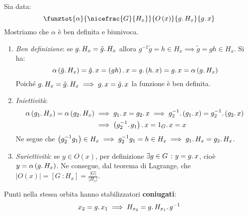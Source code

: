 \begin{demonstration}
Sia data:
\begin{equation*}
	\funztot{\alpha}{\nicefrac{G}{H_x}}{O\left(x\right)}{g\ldotp H_x}{g\ldotp x}
\end{equation*}
Mostriamo che $\alpha$ è ben definita e biunivoca.
\begin{enumerate}
	\item \textit{Ben definizione}: se $g\ldotp H_x=\tilde{g}\ldotp H_x$ allora $g^{-1}\tilde{g}=h\in H_x\implies\tilde{g}=gh\in H_x$. Si ha:
	\begin{equation*}
		\alpha\left(\tilde{g}\ldotp H_x\right)=\tilde{g}\ldotp x = \left(gh\right)\ldotp x = g \ldotp\left( h\ldotp x\right)=g\ldotp x=\alpha\left(g\ldotp H_x\right)
	\end{equation*}
 Poiché $g\ldotp H_x=\tilde{g}\ldotp H_x\implies g\ldotp x=\tilde{g}\ldotp x$ la funzione è ben definita.
 \item \textit{Iniettività}:
 \begin{align*}
 	\alpha\left(g_1\ldotp H_x\right)=\alpha\left(g_2\ldotp H_x\right)&\implies g_1\ldotp x=g_2\ldotp x\implies g_2^{-1}\ldotp\left(g_1\ldotp x\right)=g_2^{-1}\ldotp\left(g_2\ldotp x\right)\\
 	&\implies \left(g_2^{-1}\ldotp g_1\right)\ldotp x=1_G\ldotp x=x
 \end{align*}
Ne segue che $\left(g_2^{-1} g_1\right)\in H_x\implies g_2^{-1} g_1=h\in H_x\implies g_1\ldotp H_x=g_2\ldotp H_x$.
\item \textit{Suriettività}: se $y\in O\left(x\right)$, per definizione $\exists g\in G\ \colon y=g\ldotp x$, cioè $y=\alpha\left(g\ldotp H_x\right)$.
Ne consegue, dal teorema di Lagrange, che $\lvert O\left(x\right)\rvert = \left[G\ \colon H_x\right]= \frac{\lvert G\rvert}{\lvert H_x\rvert}$.
\end{enumerate}
\end{demonstration}
\begin{observe}
Punti nella stessa orbita hanno stabilizzatori \textbf{coniugati}:
\begin{equation}
x_2=g\ldotp x_1\implies H_{x_2}=g\ldotp H_{x_1}\ldotp g^{-1}
\end{equation}
\end{observe}
